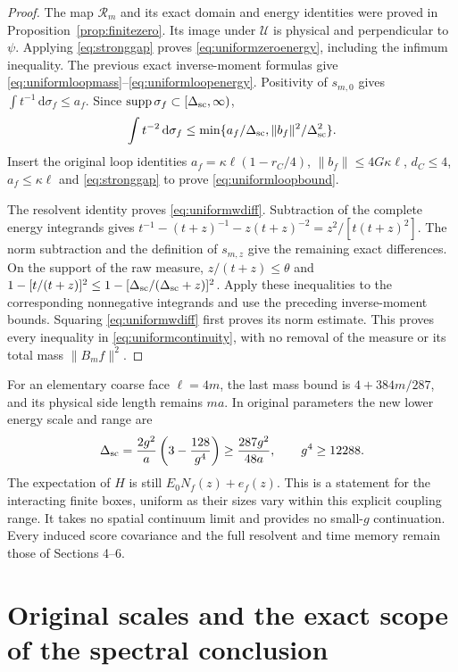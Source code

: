 \documentclass[11pt]{article}
\newcommand{\dd}{\,\mathrm d}
\begin{document}
\begin{proof}
The map $\mathcal R_m$ and its exact domain and energy identities
were proved in Proposition~\ref{prop:finitezero}. Its image under
$\mathcal U$ is physical and perpendicular to $\psi$. Applying
\eqref{eq:stronggap} proves \eqref{eq:uniformzeroenergy}, including
the infimum inequality. The previous exact inverse-moment formulas
give \eqref{eq:uniformloopmass}--\eqref{eq:uniformloopenergy}.
Positivity of $s_{m,0}$ gives
$\int t^{-1}\dd\sigma_f\leq a_f$. Since
$\operatorname{supp}\sigma_f\subset[\Delta_{\rm sc},\infty)$,
\[
 \int t^{-2}\dd\sigma_f\leq
 \min\{a_f/\Delta_{\rm sc},\|b_f\|^2/\Delta_{\rm sc}^2\}.
\]
Insert the original loop identities $a_f=\kappa\ell(1-r_C/4)$,
$\|b_f\|\leq4G\kappa\ell$, $d_C\leq4$, $a_f\leq\kappa\ell$
and \eqref{eq:stronggap} to prove \eqref{eq:uniformloopbound}.

The resolvent identity proves \eqref{eq:uniformwdiff}. Subtraction
of the complete energy integrands gives
$t^{-1}-(t+z)^{-1}-z(t+z)^{-2}=z^2/[t(t+z)^2]$.
The norm subtraction and the definition of $s_{m,z}$ give the
remaining exact differences. On the support of the raw measure,
$z/(t+z)\leq\theta$ and
$1-[t/(t+z)]^2\leq1-[\Delta_{\rm sc}/(\Delta_{\rm sc}+z)]^2$.
Apply these inequalities to the corresponding nonnegative
integrands and use the preceding inverse-moment bounds. Squaring
\eqref{eq:uniformwdiff} first proves its norm estimate. This proves
every inequality in \eqref{eq:uniformcontinuity}, with no removal
of the measure or its total mass $\|B_mf\|^2$.
\end{proof}

For an elementary coarse face $\ell=4m$, the last mass bound is
$4+384m/287$, and its physical side length remains $ma$.
In original parameters the new lower energy scale and range are
\[
 \Delta_{\rm sc}=\frac{2g^2}{a}\left(3-\frac{128}{g^4}\right)
 \geq\frac{287g^2}{48a},\qquad g^4\geq12288.
\]
The expectation of $H$ is still $E_0N_f(z)+e_f(z)$.
This is a statement for the interacting finite boxes, uniform as
their sizes vary within this explicit coupling range. It takes no
spatial continuum limit and provides no small-$g$ continuation.
Every induced score covariance and the full resolvent and time memory
remain those of Sections 4--6.


\section{Original scales and the exact scope of the spectral conclusion}
\end{document}
